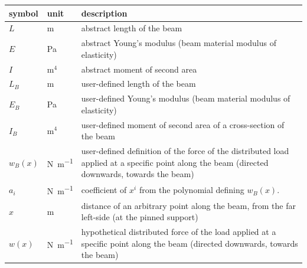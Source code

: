 \documentclass[12pt]{article}
\begin{document}
\renewcommand{\arraystretch}{1.2}
\begin{longtable}{l l p{12cm}}
    \toprule
    \textbf{symbol}   & \textbf{unit}          & \textbf{description}                                                                                                                           \\
    \midrule
    \(L\)             & \si{\metre}            & abstract length of the beam                                                                                                                    \\
    \(E\)             & \si{\pascal}           & abstract Young's modulus (beam material modulus of elasticity)                                                                                 \\
    \(I\)             & \(\si{\metre}^4\)      & abstract moment of second area                                                                                                                 \\
    \(L_{B}\)         & \si{\metre}            & user-defined length of the beam                                                                                                                \\
    \(E_{B}\)         & \si{\pascal}           & user-defined Young's modulus (beam material modulus of elasticity)                                                                             \\
    \(I_{B}\)         & \(\si{\metre}^4\)      & user-defined moment of second area of a cross-section of the beam                                                                              \\
    \(w_B(x)\)        & \si{\newton\per\metre} & user-defined definition of the force of the distributed load applied at a specific point along the beam (directed downwards, towards the beam) \\
    \(a_i\)           & \si{\newton\per\metre} & coefficient of \(x^i\) from the polynomial defining \(w_B(x)\).                                                                                \\
    \(x\)             & \si{\metre}            & distance of an arbitrary point along the beam, from the far left-side (at the pinned support)                                                  \\
    \(w(x)\)          & \si{\newton\per\metre} & hypothetical distributed force of the load applied at a specific point along the beam (directed downwards, towards the beam)                   \\

\end{longtable}
\end{document}
